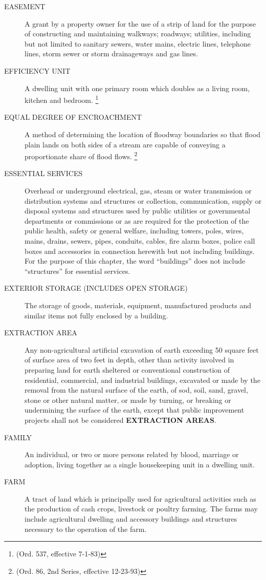 \begin{description}
    \item[EASEMENT] A grant by a property owner for the use of a strip of land for the purpose of constructing and maintaining walkways; roadways; utilities, including but not limited to sanitary sewers, water mains, electric lines, telephone lines, storm sewer or storm drainageways and gas lines.
    \item[EFFICIENCY UNIT] A dwelling unit with one primary room which doubles as a living room, kitchen and bedroom. \footnote{(Ord. 537, effective 7-1-83)}
    \item[EQUAL DEGREE OF ENCROACHMENT] A method of determining the location of floodway boundaries so that flood plain lands on both sides of a stream are capable of conveying a proportionate share of flood flows. \footnote{(Ord. 86, 2nd Series, effective 12-23-93)}
    \item[ESSENTIAL SERVICES] Overhead or underground electrical, gas, steam or water transmission or distribution systems and structures or collection, communication, supply or disposal systems and structures used by public utilities or governmental departments or commissions or as are required for the protection of the public health, safety or general welfare, including towers, poles, wires, mains, drains, sewers, pipes, conduits, cables, fire alarm boxes, police call boxes and accessories in connection herewith but not including buildings.  For the purpose of this chapter, the word “buildings” does not include “structures” for essential services.
    \item[EXTERIOR STORAGE (INCLUDES OPEN STORAGE)] The storage of goods, materials, equipment, manufactured products and similar items not fully enclosed by a building.
    \item[EXTRACTION AREA] Any non-agricultural artificial excavation of earth exceeding 50 square feet of surface area of two feet in depth, other than activity involved in preparing land for earth sheltered or conventional construction of residential, commercial, and industrial buildings, excavated or made by the removal from the natural surface of the earth, of sod, soil, sand, gravel, stone or other natural matter, or made by turning, or breaking or undermining the surface of the earth, except that public improvement projects shall not be considered \textbf{EXTRACTION AREAS}.
    \item[FAMILY] An individual, or two or more persons related by blood, marriage or adoption, living together as a single housekeeping unit in a dwelling unit.
    \item[FARM] A tract of land which is principally used for agricultural activities such as the production of cash crops, livestock or poultry farming.  The farms may include agricultural dwelling and accessory buildings and structures necessary to the operation of the farm.

\end{description}
